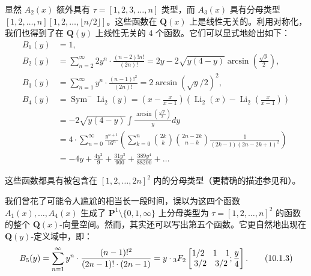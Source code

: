 显然 $A_2(x)$ 额外具有 $\tau = [1, 2, 3, \dots, n]$ 类型，而 $A_3(x)$ 具有分母类型 $[1, 2, \dots, n][1, 2, \dots, \lfloor n/2 \rfloor]$。这些函数在 $\mathbf{Q}(x)$ 上是线性无关的。利用对称化，我们也得到了在 $\mathbf{Q}(y)$ 上线性无关的 4 个函数。它们可以显式地给出如下：
\begin{equation}\label{eq:10.1.2}\tag{10.1.2}
\begin{aligned}
B_{1}(y) &= 1, \\
B_{2}(y) &= \sum_{n=2}^{\infty} 2y^{n} \cdot \frac{(n-2)!n!}{(2n)!} = 2y - 2\sqrt{y(4-y)} \arcsin\left(\frac{\sqrt{y}}{2}\right), \\
B_{3}(y) &= \sum_{n=1}^{\infty} y^{n} \cdot \frac{(n-1)!^{2}}{(2n)!} = 2\arcsin(\sqrt{y}/2)^{2}, \\
B_{4}(y) &= \operatorname{Sym}^{-}\operatorname{Li}_{2}(y) = \left(x - \frac{x}{x-1}\right)\left(\operatorname{Li}_{2}(x) - \operatorname{Li}_{2}\left(\frac{x}{x-1}\right)\right) \\
&= -2\sqrt{y(4-y)} \int \frac{\arcsin\left(\frac{\sqrt{y}}{2}\right)}{y} dy \\
&= 4 \cdot \sum_{n=0}^{\infty} \frac{y^{n+1}}{16^{n}} \left(\sum_{k=0}^{n} \binom{2k}{k} \binom{2n-2k}{n-k} \frac{1}{(2k-1)(2n-2k+1)^{2}}\right) \\
&= -4y + \frac{4y^{2}}{9} + \frac{31y^{3}}{900} + \frac{389y^{4}}{88200} + \dots
\end{aligned}
\end{equation}

这些函数都具有被包含在 $[1, 2, \dots, 2n]^2$ 内的分母类型（更精确的描述参见和）。

我们曾花了可能令人尴尬的相当长一段时间，误以为这四个函数 $A_1(x), \dots, A_4(x)$ 生成了 $\mathbf{P}^1 \setminus \{0, 1, \infty\}$ 上分母类型为 $\tau = [1, 2, \dots, n]^2$ 的函数的整个 $\mathbf{Q}(x)$-向量空间。然而，其实还可以写出第五个函数。它更自然地出现在 $\mathbf{Q}(y)$-定义域中，即：
\begin{equation}\label{eq:10.1.3}
B_5(y) = \sum_{n=1}^{\infty} y^n \cdot \frac{(n-1)!^2}{(2n-1)! \cdot (2n-1)} = y \cdot {}_{3}F_{2} \left[ \begin{matrix} 1/2 & 1 & 1 \\ \multicolumn{3}{c}{3/2 \quad 3/2} \end{matrix} ; \frac{y}{4} \right]. \tag{10.1.3}
\end{equation}

